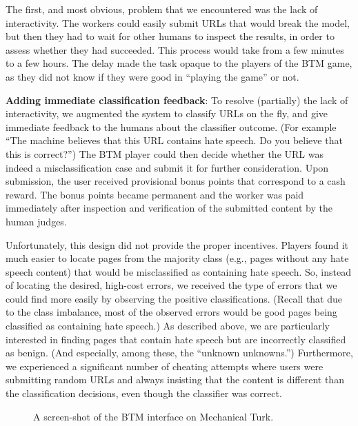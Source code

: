 The first, and most obvious, problem that we encountered was the lack of interactivity.  The workers could easily submit URLs that would break the model, but then they had to wait for other humans to inspect the results, in order to assess whether they had succeeded. This process would take from a few minutes to a few hours. The delay made the task opaque to the players of the BTM game,
as they did not know if they were good in ``playing the game'' or not.

\textbf{Adding immediate classification feedback}: To resolve (partially) the lack of interactivity, we augmented the system to classify URLs on the fly, and give immediate feedback to the humans about the classifier outcome. (For example ``The machine believes that this URL contains hate speech.  Do you believe that this is correct?'') The BTM player could then decide whether the URL was indeed a misclassification case and submit it for further consideration. Upon submission, the user received provisional bonus points that correspond to a cash reward. The bonus points became permanent and the worker was paid immediately after inspection and verification of the submitted content by the human judges.
  

Unfortunately, this design did not provide the proper incentives. Players found it much easier to locate pages from the majority class (e.g., pages without any hate speech content) that would be misclassified as containing hate speech. So, instead of locating the desired, high-cost errors, we received the type of errors that we could find more easily by observing the positive classifications.  (Recall that due to the class imbalance, most of the observed errors would be good pages being classified as containing hate speech.) As described above, we are particularly interested in finding pages that contain hate speech but are incorrectly classified as benign.  (And especially, among these, the ``unknown unknowns.'') Furthermore, we experienced a significant number of cheating attempts where users were submitting random URLs and always insisting that the content is different than the classification decisions, even though the classifier was correct.

\begin{figure}[t]
\caption{A screen-shot of the BTM interface on Mechanical Turk.}
\label{fig:btm}
\end{figure}

